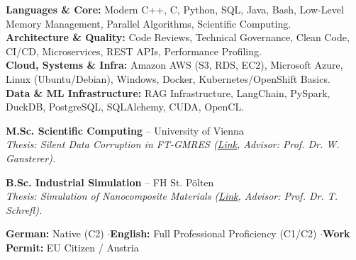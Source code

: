 \documentclass[10pt,a4paper]{article}
\begin{document}

\textbf{Languages \& Core:} Modern C++, C, Python, SQL, Java, Bash, Low-Level Memory Management, Parallel Algorithms, Scientific Computing.\\[0.05em]
\textbf{Architecture \& Quality:} Code Reviews, Technical Governance, Clean Code, CI/CD, Microservices, REST APIs, Performance Profiling.\\[0.05em]
\textbf{Cloud, Systems \& Infra:} Amazon AWS (S3, RDS, EC2), Microsoft Azure, Linux (Ubuntu/Debian), Windows, Docker, Kubernetes/OpenShift Basics.\\[0.05em]
\textbf{Data \& ML Infrastructure:} RAG Infrastructure, LangChain, PySpark, DuckDB, PostgreSQL, SQLAlchemy, CUDA, OpenCL.


\textbf{M.Sc. Scientific Computing} -- University of Vienna \\
\textit{Thesis: Silent Data Corruption in FT-GMRES (\href{https://utheses.univie.ac.at/detail/40917/}{Link}, Advisor: Prof. Dr. W. Gansterer).}

\vspace{0.1cm}
\textbf{B.Sc. Industrial Simulation} -- FH St. Pölten \\
\textit{Thesis: Simulation of Nanocomposite Materials (\href{\meinGithub/thesis/blob/master/Bakkarbeit_final.pdf}{Link}, Advisor: Prof. Dr. T. Schrefl).}

\engineeringApproach


\textbf{German:} Native (C2) \quad$\cdot$\quad \textbf{English:} Full Professional Proficiency (C1/C2) \quad$\cdot$\quad \textbf{Work Permit:} EU Citizen / Austria
\end{document}
